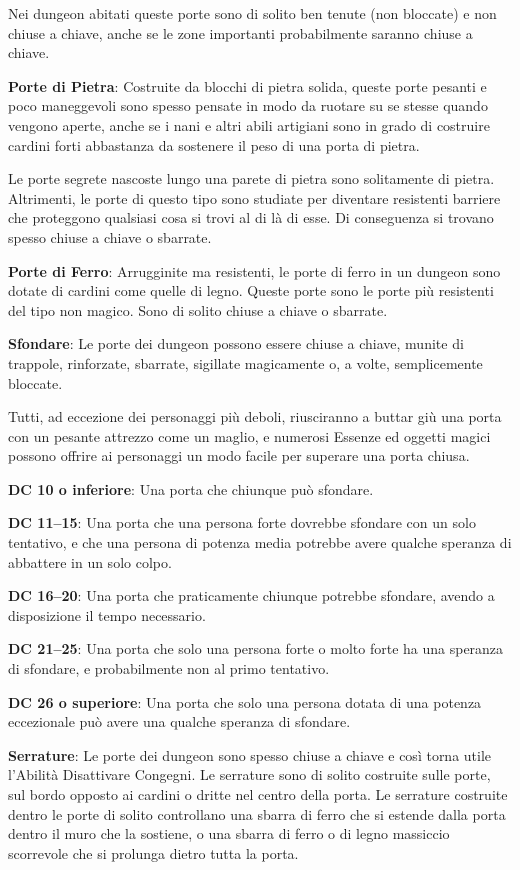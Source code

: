 \documentclass[a4paper,11pt,twoside,openany]{book}
\begin{document}
Nei dungeon abitati queste porte sono di solito ben tenute (non bloccate) e non chiuse a chiave, anche se le zone importanti probabilmente saranno chiuse a chiave.

\textbf{Porte di Pietra}: Costruite da blocchi di pietra solida, queste porte pesanti e poco maneggevoli sono spesso pensate in modo da ruotare su se stesse quando vengono aperte, anche se i nani e altri abili artigiani sono in grado di costruire cardini forti abbastanza da sostenere il peso di una porta di pietra.

Le porte segrete nascoste lungo una parete di pietra sono solitamente di pietra. Altrimenti, le porte di questo tipo sono studiate per diventare resistenti barriere che proteggono qualsiasi cosa si trovi al di là di esse. Di conseguenza si trovano spesso chiuse a chiave o sbarrate.

\textbf{Porte di Ferro}: Arrugginite ma resistenti, le porte di ferro in un dungeon sono dotate di cardini come quelle di legno. Queste porte sono le porte più resistenti del tipo non magico. Sono di solito chiuse a chiave o sbarrate.

\textbf{Sfondare}: Le porte dei dungeon possono essere chiuse a chiave, munite di trappole, rinforzate, sbarrate, sigillate magicamente o, a volte, semplicemente bloccate.

Tutti, ad eccezione dei personaggi più deboli, riusciranno a buttar giù una porta con un pesante attrezzo come un maglio, e numerosi Essenze ed oggetti magici possono offrire ai personaggi un modo facile per superare una porta chiusa.

\textbf{DC 10 o inferiore}: Una porta che chiunque può sfondare.

\textbf{DC 11--15}: Una porta che una persona forte dovrebbe sfondare con un solo tentativo, e che una persona di potenza media potrebbe avere qualche speranza di abbattere in un solo colpo.

\textbf{DC 16--20}: Una porta che praticamente chiunque potrebbe sfondare, avendo a disposizione il tempo necessario.

\textbf{DC 21--25}: Una porta che solo una persona forte o molto forte ha una speranza di sfondare, e probabilmente non al primo tentativo.

\textbf{DC 26 o superiore}: Una porta che solo una persona dotata di una potenza eccezionale può avere una qualche speranza di sfondare.

\textbf{Serrature}: Le porte dei dungeon sono spesso chiuse a chiave e così torna utile l'Abilità Disattivare Congegni. Le serrature sono di solito costruite sulle porte, sul bordo opposto ai cardini o dritte nel centro della porta. Le serrature costruite dentro le porte di solito controllano una sbarra di ferro che si estende dalla porta dentro il muro che la sostiene, o una sbarra di ferro o di legno massiccio scorrevole che si prolunga dietro tutta la porta.
\end{document}

